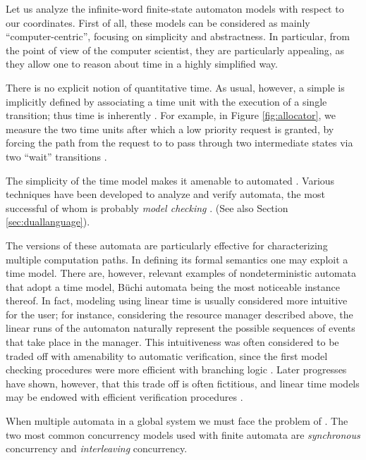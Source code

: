 Let us analyze the infinite-word finite-state automaton models 
with respect to our coordinates. First of all, these models can 
be considered as mainly ``computer-centric'', focusing on simplicity 
and abstractness. In particular, from the point of view of the 
computer scientist, they are particularly appealing, as they 
allow one to reason about time in a highly simplified way.

There is no explicit notion of quantitative time. As usual, however, 
a simple  is implicitly defined by associating a time unit 
with the execution of a single transition; thus time is inherently . 
For example, in Figure \ref{fig:allocator}, we measure  the two time units after 
which a low priority request is granted, by forcing the path 
from the request  to  to pass through two intermediate 
states via two ``wait'' transitions .

The simplicity of the time model makes it amenable to automated 
. Various techniques have been developed to analyze 
and verify automata, the most successful of whom is probably \emph{model checking} \cite{CGP00}.
(See also Section \ref{sec:duallanguage}).

The  versions of these automata are particularly 
effective for characterizing multiple computation paths. In defining 
its formal semantics one may exploit a  time model. 
There are, however, relevant examples of nondeterministic automata 
that adopt a  time model, B\"uchi automata being the most 
noticeable instance thereof. In fact, modeling using linear time 
is usually considered more intuitive for the user; for instance, 
considering the resource manager described above, the linear 
runs of the automaton naturally represent the possible sequences 
of events that take place in the manager. This intuitiveness 
was often considered to be traded off with amenability to automatic 
verification, since the first model checking procedures were 
more efficient with branching logic \cite{CGP00}. Later progresses 
have shown, however, that this trade off is often fictitious, 
and linear time models may be endowed with efficient verification 
procedures \cite{Var01}.

When  multiple automata in a global system we must face 
the problem of . The two most common concurrency models 
used with finite automata are \emph{synchronous} concurrency and \emph{interleaving} 
concurrency. 

